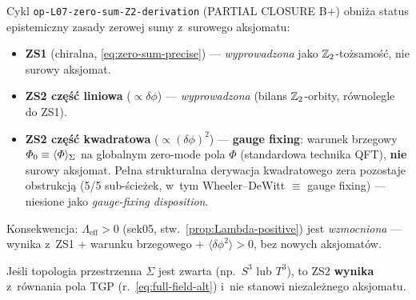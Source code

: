 \begin{remark}%
\label{rem:ZS-L07-status}
Cykl \texttt{op-L07-zero-sum-Z2-derivation} (PARTIAL CLOSURE B+)
obni\.za status epistemiczny zasady zerowej sumy z~surowego aksjomatu:
\begin{itemize}[nosep]
  \item \textbf{ZS1} (chiralna, \eqref{eq:zero-sum-precise}) ---
    \emph{wyprowadzona} jako $\mathbb{Z}_2$-to\.zsamo\'s\'c, nie surowy aksjomat.
  \item \textbf{ZS2 cz\k{e}\'s\'c liniowa} ($\propto\delta\phi$) ---
    \emph{wyprowadzona} (bilans $\mathbb{Z}_2$-orbity, r\'ownolegle do ZS1).
  \item \textbf{ZS2 cz\k{e}\'s\'c kwadratowa} ($\propto(\delta\phi)^2$) ---
    \textbf{gauge fixing}: warunek brzegowy
    $\varPhi_0 \equiv \langle\varPhi\rangle_\Sigma$ na globalnym zero-mode
    pola $\Phi$ (standardowa technika QFT), \textbf{nie} surowy aksjomat.
    Pe\l{}na strukturalna derywacja kwadratowego zera pozostaje
    obstrukcj\k{a} (5/5 sub-\'scie\.zek, w~tym Wheeler--DeWitt
    $\equiv$ gauge fixing) --- niesione jako
    \emph{gauge-fixing disposition}.
\end{itemize}
Konsekwencja: $\Lambda_{\mathrm{eff}}>0$
(sek05, stw.~\ref{prop:Lambda-positive}) jest \emph{wzmocniona} ---
wynika z~ZS1 $+$ warunku brzegowego $+$ $\langle\delta\phi^2\rangle>0$,
bez nowych aksjomat\'ow.
\end{remark}

\begin{proposition}%
\label{prop:ZS2-from-dynamics}
Je\.sli topologia przestrzenna $\Sigma$ jest zwarta (np.~$S^3$ lub $T^3$),
to ZS2 \textbf{wynika} z~r\'ownania pola TGP
(r.~\eqref{eq:full-field-alt}) i~nie stanowi niezale\.znego aksjomatu.
\end{proposition}


